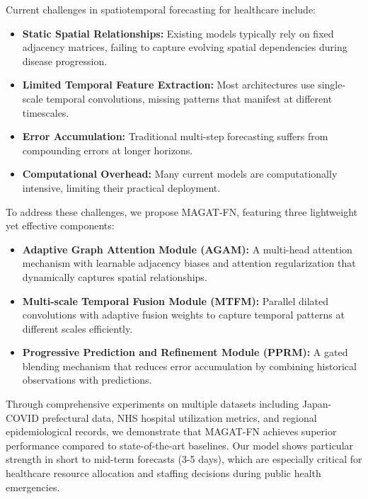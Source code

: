 \documentclass[lettersize, journal]{IEEEtran}
\begin{document}
Current challenges in spatiotemporal forecasting for healthcare include:

\begin{itemize}
\item \textbf{Static Spatial Relationships:} Existing models typically rely on fixed adjacency matrices, failing to capture evolving spatial dependencies during disease progression.
\item \textbf{Limited Temporal Feature Extraction:} Most architectures use single-scale temporal convolutions, missing patterns that manifest at different timescales.
\item \textbf{Error Accumulation:} Traditional multi-step forecasting suffers from compounding errors at longer horizons.
\item \textbf{Computational Overhead:} Many current models are computationally intensive, limiting their practical deployment.
\end{itemize}

To address these challenges, we propose MAGAT-FN, featuring three lightweight yet effective components:

\begin{itemize}
\item \textbf{Adaptive Graph Attention Module (AGAM):} A multi-head attention mechanism with learnable adjacency biases and attention regularization that dynamically captures spatial relationships.
\item \textbf{Multi-scale Temporal Fusion Module (MTFM):} Parallel dilated convolutions with adaptive fusion weights to capture temporal patterns at different scales efficiently.
\item \textbf{Progressive Prediction and Refinement Module (PPRM):} A gated blending mechanism that reduces error accumulation by combining historical observations with predictions.
\end{itemize}

Through comprehensive experiments on multiple datasets including Japan-COVID prefectural data, NHS hospital utilization metrics, and regional epidemiological records, we demonstrate that MAGAT-FN achieves superior performance compared to state-of-the-art baselines. Our model shows particular strength in short to mid-term forecasts (3-5 days), which are especially critical for healthcare resource allocation and staffing decisions during public health emergencies.
\end{document}
